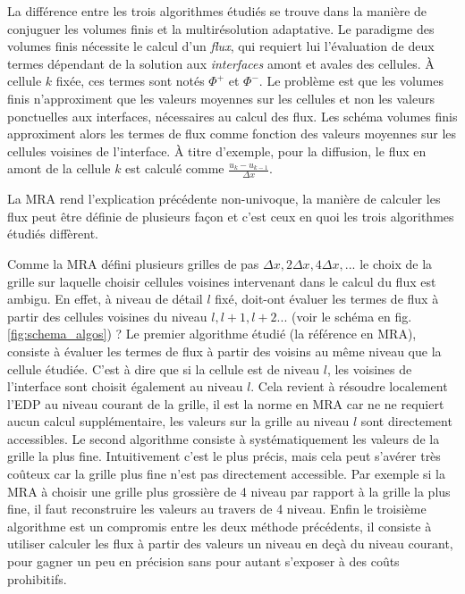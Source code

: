 La différence entre les trois algorithmes étudiés se trouve dans la manière de conjuguer les volumes finis \cite{LeVeque1990} et la multirésolution adaptative.
Le paradigme des volumes finis nécessite le calcul d'un \textit{flux},
qui requiert lui l'évaluation de deux termes dépendant de la solution aux \textit{interfaces} amont et avales des cellules. À cellule $k$ fixée, ces termes sont notés $\Phi^+$ et $\Phi^-$.
Le problème est que les volumes finis n'approximent que les valeurs moyennes sur les cellules et non les valeurs ponctuelles aux interfaces, nécessaires au calcul des flux.
Les schéma volumes finis approximent alors les termes de flux comme fonction des valeurs moyennes sur les cellules voisines de l'interface.
À titre d'exemple, pour la diffusion, le flux en amont de la cellule $k$ est calculé comme $\frac{u_{k} - u_{k-1}}{\Delta x}$.\par
La MRA rend l'explication précédente non-univoque, la manière de calculer les flux peut être définie de plusieurs façon et c'est ceux en quoi les trois algorithmes étudiés diffèrent.\par 
Comme la MRA défini plusieurs grilles de pas $\Delta x,2 \Delta x, 4 \Delta x,...$ le choix de la grille sur laquelle choisir cellules voisines intervenant dans le calcul du flux est ambigu. 
En effet, à niveau de détail $l$ fixé, doit-ont évaluer les termes de flux à partir des cellules voisines du niveau $l,l+1,l+2...$ (voir le schéma en fig. \ref{fig:schema_algos}) ? 
Le premier algorithme étudié (la référence en MRA), consiste à évaluer les termes de flux à partir des voisins au même niveau que la cellule étudiée. C'est à dire que 
si la cellule est de niveau $l$, les voisines de l'interface sont choisit également au niveau $l$. Cela revient à résoudre localement l'EDP au niveau courant de la grille,
il est la norme en MRA car ne ne requiert aucun calcul supplémentaire, les valeurs sur la grille au niveau $l$ sont directement accessibles.
Le second algorithme consiste à systématiquement les valeurs de la grille la plus fine. Intuitivement c'est le plus précis, mais cela peut s'avérer très coûteux car 
la grille plus fine n'est pas directement accessible. Par exemple si la MRA à choisir une grille plus grossière de 4 niveau par rapport à la grille la plus fine, il 
faut reconstruire les valeurs au travers de 4 niveau. Enfin le troisième algorithme est un compromis entre les deux méthode précédents, il consiste à utiliser calculer les flux à partir des valeurs un niveau en deçà du niveau courant, pour gagner un peu en précision sans pour autant s'exposer à des coûts prohibitifs.

